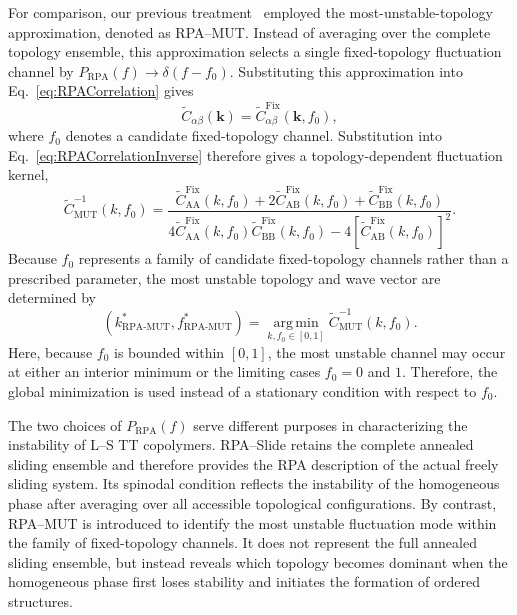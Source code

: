 \documentclass[journal=mamobx,manuscript=article]{achemso}
\begin{document}
	For comparison, our previous treatment~\cite{Zhao2024Phase} employed the most-unstable-topology approximation, denoted as RPA--MUT.
	Instead of averaging over the complete topology ensemble, this approximation selects a single fixed-topology fluctuation channel by $P_{\mathrm{RPA}}(f)\rightarrow\delta(f-f_0)$.
	Substituting this approximation into Eq.~\eqref{eq:RPACorrelation} gives
	\begin{equation}
		\widetilde C_{\alpha\beta}(\bm k)
		=
		\widetilde C_{\alpha\beta}^{\mathrm{Fix}}
		(\bm k,f_0),
	\end{equation}
	where $f_0$ denotes a candidate fixed-topology channel.
	Substitution into Eq.~\eqref{eq:RPACorrelationInverse} therefore gives a topology-dependent fluctuation kernel,
	\begin{equation}
		\widetilde C_{\mathrm{MUT}}^{-1}(k,f_0)
		=
		\frac{
			\widetilde C_{\mathrm{AA}}^{\mathrm{Fix}}(k,f_0)
			+2\widetilde C_{\mathrm{AB}}^{\mathrm{Fix}}(k,f_0)
			+\widetilde C_{\mathrm{BB}}^{\mathrm{Fix}}(k,f_0)
		}
		{
			4\widetilde C_{\mathrm{AA}}^{\mathrm{Fix}}(k,f_0)
			\widetilde C_{\mathrm{BB}}^{\mathrm{Fix}}(k,f_0)
			-
			4[\widetilde C_{\mathrm{AB}}^{\mathrm{Fix}}(k,f_0)]^2
		} .
	\end{equation}
	Because $f_0$ represents a family of candidate fixed-topology channels rather than a prescribed parameter, the most unstable topology and wave vector are determined by
	\begin{equation}
		(k_{\mathrm{RPA\text{-}MUT}}^\ast,
		f_{\mathrm{RPA\text{-}MUT}}^\ast)
		=
		\operatorname*{arg\,min}_{k,f_0\in[0,1]}
		\widetilde C_{\mathrm{MUT}}^{-1}(k,f_0).
	\end{equation}
	Here, because $f_0$ is bounded within $[0,1]$, the most unstable channel may occur at either an interior minimum or the limiting cases $f_0=0$ and $1$.
	Therefore, the global minimization is used instead of a stationary condition with respect to $f_0$.

	The two choices of $P_{\mathrm{RPA}}(f)$ serve different purposes in characterizing the instability of L--S TT copolymers.
	RPA--Slide retains the complete annealed sliding ensemble and therefore provides the RPA description of the actual freely sliding system.
	Its spinodal condition reflects the instability of the homogeneous phase after averaging over all accessible topological configurations.
	By contrast, RPA--MUT is introduced to identify the most unstable fluctuation mode within the family of fixed-topology channels.
	It does not represent the full annealed sliding ensemble, but instead reveals which topology becomes dominant when the homogeneous phase first loses stability and initiates the formation of ordered structures.
\end{document}
